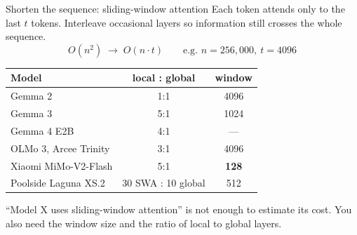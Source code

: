 \documentclass[aspectratio=169,10pt]{beamer}
\begin{document}
\begin{frame}[shrink=9]{Shorten the sequence: sliding-window attention}
  Each token attends only to the last $t$ tokens. Interleave occasional
   layers so information still crosses the whole sequence.
  \[
    O(n^2) \;\longrightarrow\; O(n \cdot t)
    \qquad\text{e.g. } n = 256{,}000,\ t = 4096
  \]
  \vspace{-0.4em}
  \centering
  \begin{tabular}{@{}l c c@{}}
    \toprule
    \textbf{Model} & \textbf{local : global} & \textbf{window}\\
    \midrule
    Gemma 2 & 1:1 & 4096\\
    Gemma 3 & 5:1 & 1024\\
    Gemma 4 E2B & 4:1 & ---\\
    OLMo 3, Arcee Trinity & 3:1 & 4096\\
    Xiaomi MiMo-V2-Flash & 5:1 & \textbf{128}\\
    Poolside Laguna XS.2 & 30 SWA : 10 global & 512\\
    \bottomrule
  \end{tabular}
  \vspace{0.7em}
  \begin{gotcha}
    ``Model X uses sliding-window attention'' is not enough to estimate its
    cost. You also need the window size and the ratio of local to global
    layers.
  \end{gotcha}
\end{frame}
\end{document}
